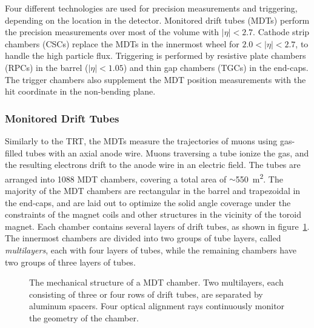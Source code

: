 Four different technologies are used for precision measurements and triggering, depending on the location in the detector. Monitored drift tubes (MDTs) perform the precision measurements over most of the volume with $|\eta|<2.7$. Cathode strip chambers (CSCs) replace the MDTs in the innermost wheel for $2.0<|\eta|<2.7$, to handle the high particle flux. Triggering is performed by resistive plate chambers (RPCs) in the barrel ($|\eta|<1.05$) and thin gap chambers (TGCs) in the end-caps. The trigger chambers also supplement the MDT position measurements with the hit coordinate in the non-bending plane. 

\subsubsection{Monitored Drift Tubes}
Similarly to the TRT, the MDTs measure the trajectories of muons using gas-filled tubes with an axial anode wire. Muons traversing a tube ionize the gas, and the resulting electrons drift to the anode wire in an electric field. The tubes are arranged into 1088 MDT chambers, covering a total area of $\sim$\SI{550}{\meter\tothe{2}}. The majority of the MDT chambers are rectangular in the barrel and trapezoidal in the end-caps, and are laid out to optimize the solid angle coverage under the constraints of the magnet coils and other structures in the vicinity of the toroid magnet. Each chamber contains several layers of drift tubes, as shown in figure~\ref{fig:ATLAS-MS-MDT-chamber}. The innermost chambers are divided into two groups of tube layers, called \emph{multilayers}, each with four layers of tubes, while the remaining chambers have two groups of three layers of tubes. 

\begin{figure}[htbp]
	\centering
	\caption{The mechanical structure of a MDT chamber. Two multilayers, each consisting of three or four rows of drift tubes, are separated by aluminum spacers. Four optical alignment rays continuously monitor the geometry of the chamber.}
	\label{fig:ATLAS-MS-MDT-chamber}
\end{figure}

